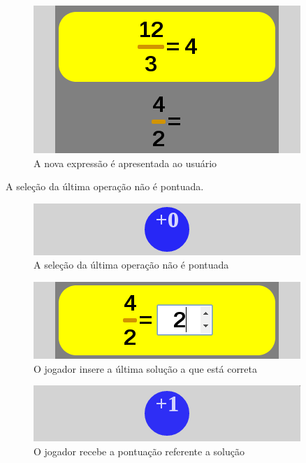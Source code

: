 \begin{figure}[H]
	\caption{\label{xp_8}A nova expressão é apresentada ao usuário}
	\begin{center}
	    \includegraphics[scale=1]{xp_4_8.png}
	\end{center}
\end{figure}

A seleção da última operação não é pontuada.

\begin{figure}[H]
	\caption{\label{score_0_1}A seleção da última operação não é pontuada}
	\begin{center}
	    \includegraphics[scale=1]{score_0.png}
	\end{center}
\end{figure}

\begin{figure}[H]
	\caption{\label{xp_10}O jogador insere a última solução a que está correta}
	\begin{center}
	    \includegraphics[scale=1]{xp_4_10_rightans_3.png}
	\end{center}
\end{figure}

\begin{figure}[H]
	\caption{\label{score_1_3}O jogador recebe a pontuação referente a solução}
	\begin{center}
	    \includegraphics[scale=1]{score_1.png}
	\end{center}
\end{figure}


